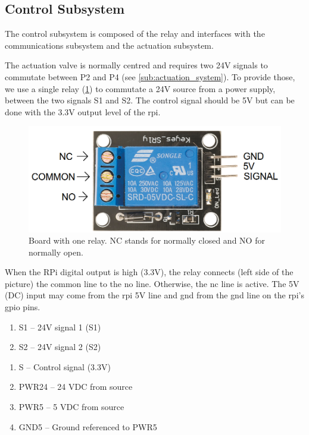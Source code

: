 \documentclass[twoside,a4paper]{refart}
\begin{document}
\subsection{Control Subsystem}
The control subsystem is composed of the relay and interfaces with the communications subsystem and the actuation subsystem.

 The actuation valve is normally centred and requires two 24V signals to commutate between P2 and P4 (see \cref{sub:actuation_system}). To provide those, we use a single relay (\cref{fig:relay_0}) to commutate a 24V source from a power supply, between the two signals S1 and S2. The control signal should be 5V but can be done with the 3.3V output level of the \gls{rpi}.

\begin{figure}[H]
	\centering
	\includegraphics[width=0.7\linewidth]{relay_0}
	\caption{Board with one relay. NC stands for normally closed and NO for normally open.}
	\label{fig:relay_0}
\end{figure}

When the RPi digital output is high (3.3V), the relay connects (left side of the picture) the common line to the \gls{no} line. Otherwise, the \gls{nc} line is active.
The 5V (DC) input may come from the \gls{rpi} 5V line and \gls{gnd} from the \gls{gnd} line on the \gls{rpi}'s \gls{gpio} pins.

\begin{enumerate}
	\item
	S1 -- 24V signal 1 (S1)
	\item
	S2 -- 24V signal 2 (S2)
\end{enumerate}

\begin{enumerate}
	\item
	 S -- Control signal (3.3V)
	\item PWR24 -- 24 VDC from source
	\item PWR5 -- 5 VDC from source
	\item GND5 -- Ground referenced to PWR5
\end{enumerate}
\end{document}
